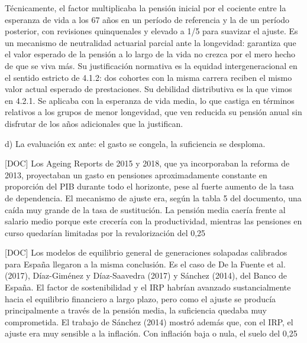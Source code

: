 \documentclass[10pt,a4paper]{article}
\begin{document}
Técnicamente, el factor multiplicaba la pensión inicial por el cociente entre la esperanza de vida a los 67 años en un período de referencia y la de un período posterior, con revisiones quinquenales y elevado a 1/5 para suavizar el ajuste. Es un mecanismo de neutralidad actuarial parcial ante la longevidad: garantiza que el valor esperado de la pensión a lo largo de la vida no crezca por el mero hecho de que se viva más. Su justificación normativa es la equidad intergeneracional en el sentido estricto de 4.1.2: dos cohortes con la misma carrera reciben el mismo valor actual esperado de prestaciones. Su debilidad distributiva es la que vimos en 4.2.1. Se aplicaba con la esperanza de vida media, lo que castiga en términos relativos a los grupos de menor longevidad, que ven reducida su pensión anual sin disfrutar de los años adicionales que la justifican.

d) La evaluación ex ante: el gasto se congela, la suficiencia se desploma.

[DOC] Los Ageing Reports de 2015 y 2018, que ya incorporaban la reforma de 2013, proyectaban un gasto en pensiones aproximadamente constante en proporción del PIB durante todo el horizonte, pese al fuerte aumento de la tasa de dependencia. El mecanismo de ajuste era, según la tabla 5 del documento, una caída muy grande de la tasa de sustitución. La pensión media caería frente al salario medio porque este crecería con la productividad, mientras las pensiones en curso quedarían limitadas por la revalorización del 0,25%

[DOC] Los modelos de equilibrio general de generaciones solapadas calibrados para España llegaron a la misma conclusión. Es el caso de De la Fuente et al. (2017), Díaz-Giménez y Díaz-Saavedra (2017) y Sánchez (2014), del Banco de España. El factor de sostenibilidad y el IRP habrían avanzado sustancialmente hacia el equilibrio financiero a largo plazo, pero como el ajuste se producía principalmente a través de la pensión media, la suficiencia quedaba muy comprometida. El trabajo de Sánchez (2014) mostró además que, con el IRP, el ajuste era muy sensible a la inflación. Con inflación baja o nula, el suelo del 0,25%
\end{document}
